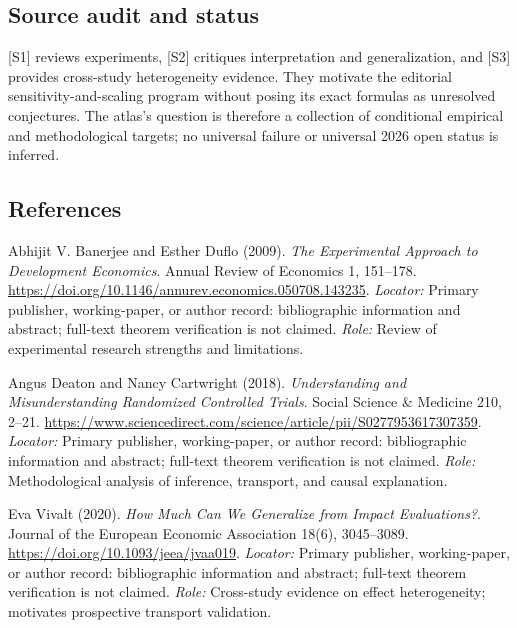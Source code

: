\documentclass[11pt,a4paper]{article}
\begin{document}
\subsection*{Source audit and status}
[S1] reviews experiments, [S2] critiques interpretation and generalization, and [S3] provides cross-study heterogeneity evidence. They motivate the editorial sensitivity-and-scaling program without posing its exact formulas as unresolved conjectures. The atlas's question is therefore a collection of conditional empirical and methodological targets; no universal failure or universal 2026 open status is inferred.

\subsection*{References}
\begin{enumerate}[label=\textnormal{[S\arabic*]},leftmargin=*]
\item Abhijit V. Banerjee and Esther Duflo (2009). \emph{The Experimental Approach to Development Economics}. Annual Review of Economics 1, 151--178. \url{https://doi.org/10.1146/annurev.economics.050708.143235}. \textit{Locator:} Primary publisher, working-paper, or author record: bibliographic information and abstract; full-text theorem verification is not claimed. \textit{Role:} Review of experimental research strengths and limitations.
\item Angus Deaton and Nancy Cartwright (2018). \emph{Understanding and Misunderstanding Randomized Controlled Trials}. Social Science \& Medicine 210, 2--21. \url{https://www.sciencedirect.com/science/article/pii/S0277953617307359}. \textit{Locator:} Primary publisher, working-paper, or author record: bibliographic information and abstract; full-text theorem verification is not claimed. \textit{Role:} Methodological analysis of inference, transport, and causal explanation.
\item Eva Vivalt (2020). \emph{How Much Can We Generalize from Impact Evaluations?}. Journal of the European Economic Association 18(6), 3045--3089. \url{https://doi.org/10.1093/jeea/jvaa019}. \textit{Locator:} Primary publisher, working-paper, or author record: bibliographic information and abstract; full-text theorem verification is not claimed. \textit{Role:} Cross-study evidence on effect heterogeneity; motivates prospective transport validation.
\end{enumerate}
\end{document}
